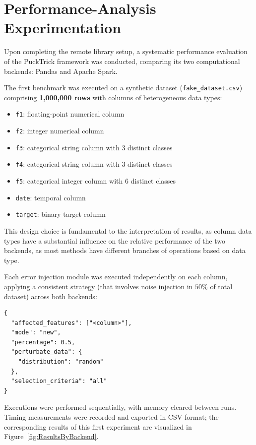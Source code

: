 \documentclass[../main.tex]{subfiles}
\begin{document}
\newpage
\section{Performance-Analysis Experimentation}
\label{sec:Library_stress_test}


Upon completing the remote library setup, a systematic performance evaluation of the PuckTrick framework was conducted, comparing its two computational backends: Pandas and Apache Spark.

The first benchmark was executed on a synthetic dataset (\texttt{fake\_dataset.csv}) comprising \textbf{1{,}000{,}000 rows} with columns of heterogeneous data types:

\begin{itemize}
    \item \texttt{f1}: floating-point numerical column
    \item \texttt{f2}: integer numerical column
    \item \texttt{f3}: categorical string column with 3 distinct classes
    \item \texttt{f4}: categorical string column with 3 distinct classes
    \item \texttt{f5}: categorical integer column with 6 distinct classes
    \item \texttt{date}: temporal column
    \item \texttt{target}: binary target column
\end{itemize}

This design choice is fundamental to the interpretation of results, as column data types have a substantial influence on the relative performance of the two backends, as most methods have different branches of operations based on data type.

Each error injection module was executed independently on each column, applying a consistent strategy (that involves noise injection in $50\%$ of total dataset) across both backends:

\begin{verbatim}
{
  "affected_features": ["<column>"],
  "mode": "new",
  "percentage": 0.5,
  "perturbate_data": {
    "distribution": "random"
  },
  "selection_criteria": "all"
}
\end{verbatim}

Executions were performed sequentially, with memory cleared between runs. Timing measurements were recorded and exported in CSV format; the corresponding results of this first experiment are visualized in Figure~\ref{fig:ResultsByBackend}.
\end{document}
